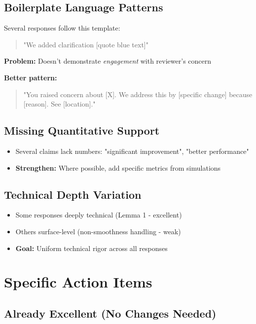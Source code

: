 \documentclass[11pt]{article}
\begin{document}
\subsection{Boilerplate Language Patterns}

Several responses follow this template:
\begin{quote}
"We added clarification [quote blue text]"
\end{quote}

\textbf{Problem:} Doesn't demonstrate \textit{engagement} with reviewer's concern

\textbf{Better pattern:}
\begin{quote}
"You raised concern about [X]. We address this by [specific change] because [reason]. See [location]."
\end{quote}

\subsection{Missing Quantitative Support}

\begin{itemize}
\item Several claims lack numbers: "significant improvement", "better performance"
\item \textbf{Strengthen:} Where possible, add specific metrics from simulations
\end{itemize}

\subsection{Technical Depth Variation}

\begin{itemize}
\item Some responses deeply technical (Lemma 1 - excellent)
\item Others surface-level (non-smoothness handling - weak)
\item \textbf{Goal:} Uniform technical rigor across all responses
\end{itemize}

\section{Specific Action Items}

\subsection{Already Excellent (No Changes Needed)}
\end{document}
